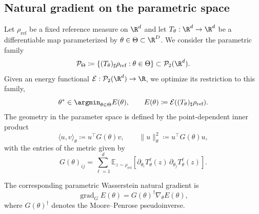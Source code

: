 \documentclass{article} %
\numberwithin{equation}{subsection}
\numberwithin{theorem}{section}
\newcommand{\cE}{\mathcal{E}}
\newcommand{\cP}{\mathcal{P}}
\newcommand{\rhoref}{{\rho_{\text{ref}}}}
\newcommand{\PWspace}{\mathcal{P}_\Theta}
\begin{document}


    \subsection{Natural gradient on the parametric space}

    Let $\rhoref$ be a fixed reference measure on $\R^d$ and let $T_\theta:\R^d\to\R^d$ be a differentiable map parameterized by $\theta\in\Theta\subset\R^D$. We consider the parametric family
\begin{equation}
    \PWspace \coloneqq  \{(T_\theta)_\sharp\rhoref:\theta\in\Theta\}\subset \mathcal{P}_2(\R^d).
\end{equation}
Given an energy functional $\cE:\cP_2(\R^d)\to\R$, we optimize its restriction to this family,
\begin{equation}\label{eq:parametric_problem}
    \theta^*\in\argmin_{\theta\in\Theta} E(\theta),
    \qquad
    E(\theta)\coloneqq \cE((T_\theta)_\sharp\rhoref).
\end{equation}
The geometry in the parameter space is defined by  the point-dependent inner product
\begin{equation}\label{eq:metric_inner_product}
    \langle u,v\rangle_\theta \coloneqq  u^\top G(\theta)v,
    \qquad
    \|u\|_\theta^2 \coloneqq  u^\top G(\theta)u,
\end{equation}
with the entries of the metric given by 
\begin{equation}
    G(\theta)_{ij}
    =\sum_{\ell=1}^d \mathbb{E}_{z\sim\rhoref}
    \left[\partial_{\theta_i}T_\theta^\ell(z)\,\partial_{\theta_j}T_\theta^\ell(z)\right].
\end{equation}

The corresponding parametric Wasserstein natural gradient is
\begin{equation}\label{eq:natural_gradient}
    \operatorname{grad}_G E(\theta)=G(\theta)^\dagger \nabla_\theta E(\theta),
\end{equation}
where $G(\theta)^\dagger$ denotes the Moore--Penrose pseudoinverse. %
\end{document}
